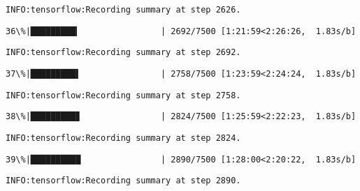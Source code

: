 \documentclass[11pt]{article}
\begin{document}
    \begin{Verbatim}[commandchars=\\\{\}]
INFO:tensorflow:Recording summary at step 2626.

    \end{Verbatim}

    \begin{Verbatim}[commandchars=\\\{\}]
 36\%|█████████▎                | 2692/7500 [1:21:59<2:26:26,  1.83s/b]
    \end{Verbatim}

    \begin{Verbatim}[commandchars=\\\{\}]
INFO:tensorflow:Recording summary at step 2692.

    \end{Verbatim}

    \begin{Verbatim}[commandchars=\\\{\}]
 37\%|█████████▌                | 2758/7500 [1:23:59<2:24:24,  1.83s/b]
    \end{Verbatim}

    \begin{Verbatim}[commandchars=\\\{\}]
INFO:tensorflow:Recording summary at step 2758.

    \end{Verbatim}

    \begin{Verbatim}[commandchars=\\\{\}]
 38\%|█████████▊                | 2824/7500 [1:25:59<2:22:23,  1.83s/b]
    \end{Verbatim}

    \begin{Verbatim}[commandchars=\\\{\}]
INFO:tensorflow:Recording summary at step 2824.

    \end{Verbatim}

    \begin{Verbatim}[commandchars=\\\{\}]
 39\%|██████████                | 2890/7500 [1:28:00<2:20:22,  1.83s/b]
    \end{Verbatim}

    \begin{Verbatim}[commandchars=\\\{\}]
INFO:tensorflow:Recording summary at step 2890.

    \end{Verbatim}
\end{document}
